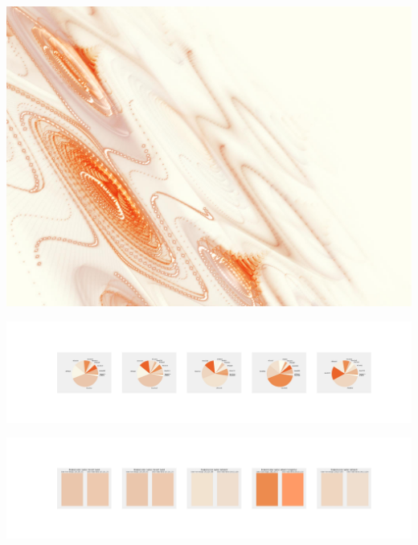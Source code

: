 \documentclass[11pt]{article}
\begin{document}
\begin{landscape}
    \begin{center}
    \includegraphics[width=\textwidth]{./nbimg/file (112).jpg}
    \end{center}

    \begin{center}
    \includegraphics[width=250mm]{./nbimg/pie-15.jpg}
    \end{center}

    \begin{center}
    \includegraphics[width=250mm]{./nbimg/peak-15.jpg}
    \end{center}
    


\end{landscape}
\end{document}
